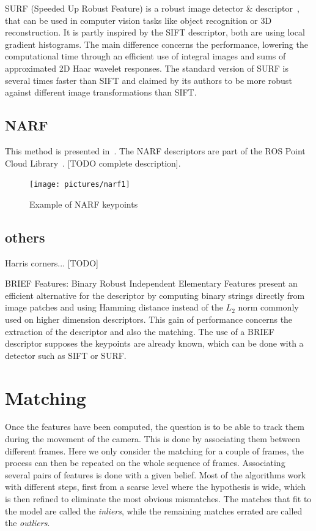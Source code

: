 SURF (Speeded Up Robust Feature) is a robust image detector \& descriptor~\cite{surf}, that can be used in computer vision tasks like object recognition or 3D reconstruction. It is partly inspired by the SIFT descriptor, both are using local gradient histograms. The main difference concerns the performance, lowering the computational time through an efficient use of integral images and sums of approximated 2D Haar wavelet responses. The standard version of SURF is several times faster than SIFT and claimed by its authors to be more robust against different image transformations than SIFT. 

\subsection{NARF}

This method is presented in~\cite{steder10irosws}. The NARF descriptors are part of the ROS Point Cloud Library~\cite{Rusu_ICRA2011_PCL}. [TODO complete description].

\begin{figure}[H]
\centering
\texttt{[image: pictures/narf1]}
\caption{Example of NARF keypoints}
\end{figure}

\subsection{others}

Harris corners... [TODO]

BRIEF Features\cite{Calonder10-brief}: Binary Robust Independent Elementary Features present an efficient alternative for the descriptor by computing  binary strings directly from image patches and using Hamming distance instead of the $L_2$ norm commonly used on higher dimension descriptors. This gain of performance concerns the extraction of the descriptor and also the matching. The use of a BRIEF descriptor supposes the keypoints are already known, which can be done with a detector such as SIFT or SURF.

\section{Matching}

Once the features have been computed, the question is to be able to track them during the movement of the camera. This is done by associating them between different frames. Here we only consider the matching for a couple of frames, the process can then be repeated on the whole sequence of frames. Associating several pairs of features is done with a given belief. Most of the algorithms work with different steps, first from a scarse level where the hypothesis is wide, which is then refined to eliminate the most obvious mismatches. The matches that fit to the model are called the \emph{inliers}, while the remaining matches errated are called the \emph{outliers}.


